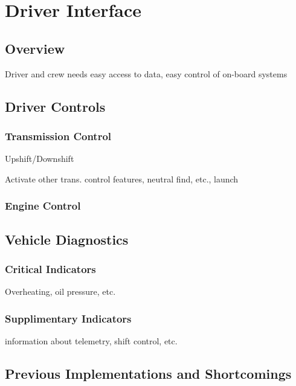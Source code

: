 
\section{Driver Interface}


\subsection{Overview}

Driver and crew needs easy access to data, easy control of on-board
systems


\subsection{Driver Controls}


\subsubsection{Transmission Control}

Upshift/Downshift

Activate other trans. control features, neutral find, etc., launch


\subsubsection{Engine Control}


\subsection{Vehicle Diagnostics}


\subsubsection{Critical Indicators}

Overheating, oil pressure, etc.


\subsubsection{Supplimentary Indicators}

information about telemetry, shift control, etc.


\subsection{Previous Implementations and Shortcomings}